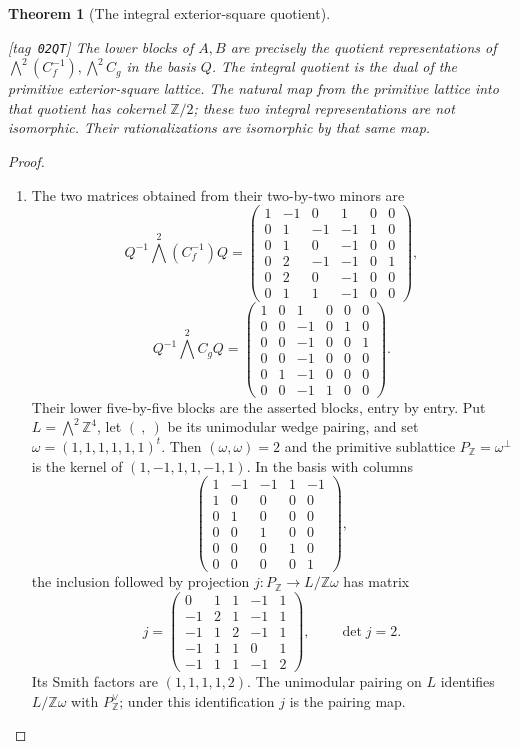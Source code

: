 \documentclass[11pt,a4paper]{article}
\numberwithin{equation}{section}
\newtheorem{theorem}{Theorem}[section]
\theoremstyle{definition}
\newcommand{\StatementRecord}[4]{{\upshape\footnotesize[tag~\texttt{#3}]}\enspace\ignorespaces}
\begin{document}
\begin{theorem}[The integral exterior-square quotient]\hypertarget{tag-02QT}{}\label{night:P1.2}
\StatementRecord{night:P1.2}{proved}{02QT}{the definitions and constructions stated in the proof}
The lower blocks of $A,B$ are precisely the quotient representations of
$\bigwedge^2(C_f^{-1}),\bigwedge^2C_g$ in the basis $Q$.
The integral quotient is the dual of the primitive exterior-square
lattice.  The natural map from the primitive lattice into that quotient
has cokernel $\mathbb Z/2$; these two integral representations are not
isomorphic.  Their rationalizations are isomorphic by that same map.
\end{theorem}
\begin{proof}
\begin{enumerate}[label=\arabic*.]
\item The two matrices obtained from their two-by-two minors are
\[
Q^{-1}\bigwedge^2(C_f^{-1})Q=
\begin{pmatrix}
1&-1&0&1&0&0\\0&1&-1&-1&1&0\\0&1&0&-1&0&0\\
0&2&-1&-1&0&1\\0&2&0&-1&0&0\\0&1&1&-1&0&0
\end{pmatrix},
\]
\[
Q^{-1}\bigwedge^2C_gQ=
\begin{pmatrix}
1&0&1&0&0&0\\0&0&-1&0&1&0\\0&0&-1&0&0&1\\
0&0&-1&0&0&0\\0&1&-1&0&0&0\\0&0&-1&1&0&0
\end{pmatrix}.
\]
Their lower five-by-five blocks are the asserted blocks, entry by entry.
Put $L=\bigwedge^2\mathbb Z^4$, let $(\ ,\ )$ be its unimodular wedge
pairing, and set $\omega=(1,1,1,1,1,1)^t$.
Then $(\omega,\omega)=2$ and the primitive sublattice
$P_{\mathbb Z}=\omega^\perp$ is the kernel of
$(1,-1,1,1,-1,1)$.  In the basis with columns
\[
\begin{pmatrix}
1&-1&-1&1&-1\\1&0&0&0&0\\0&1&0&0&0\\
0&0&1&0&0\\0&0&0&1&0\\0&0&0&0&1
\end{pmatrix},
\]
the inclusion followed by projection
$j:P_{\mathbb Z}\longrightarrow L/\mathbb Z\omega$ has matrix
\[
j=\begin{pmatrix}
0&1&1&-1&1\\-1&2&1&-1&1\\-1&1&2&-1&1\\
-1&1&1&0&1\\-1&1&1&-1&2
\end{pmatrix},\qquad \det j=2.
\]
Its Smith factors are $(1,1,1,1,2)$.  The unimodular pairing on $L$
identifies $L/\mathbb Z\omega$ with $P_{\mathbb Z}^\vee$;
under this identification $j$ is the pairing map.


\end{enumerate}
\end{proof}
\end{document}
